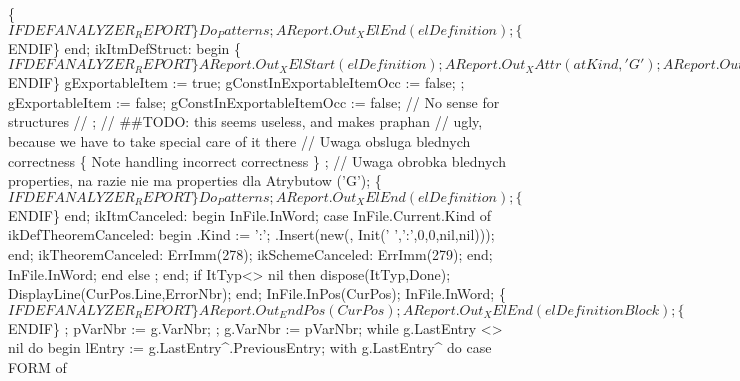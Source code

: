             \{$IFDEF ANALYZER_REPORT\}
            Do_Patterns;
            AReport.Out_XElEnd(elDefinition);
            \{$ENDIF\}
         end;
      ikItmDefStruct:
         begin
            \{$IFDEF ANALYZER_REPORT\}
            AReport.Out_XElStart(elDefinition);
            AReport.Out_XAttr(atKind, 'G');
            AReport.Out_XAttrEnd;
            \{$ENDIF\}
            gExportableItem := true;
            gConstInExportableItemOcc := false;
            ;
            gExportableItem := false;
            gConstInExportableItemOcc := false;
            // No sense for structures
            //     ;
            // ##TODO: this  seems useless, and makes praphan
            //         ugly, because we have to take special care of it there
            //   Uwaga obsluga blednych correctness
            \{ Note handling incorrect correctness \}
            ;
            //   Uwaga obrobka blednych properties, na razie nie ma properties dla Atrybutow
            ('G');
            \{$IFDEF ANALYZER_REPORT\}
            Do_Patterns;
            AReport.Out_XElEnd(elDefinition);
            \{$ENDIF\}
         end;
      ikItmCanceled:
         begin
            InFile.InWord;
            case InFile.Current.Kind of
               ikDefTheoremCanceled:
                  begin
                     .Kind := ':';
                     .Insert(new(, Init(' ',':',0,0,nil,nil)));
                  end;
               ikTheoremCanceled:
                  ErrImm(278);
               ikSchemeCanceled:
                  ErrImm(279);
            end;
            InFile.InWord;
         end
   else ;
   end;
   if ItTyp<> nil then dispose(ItTyp,Done);
   DisplayLine(CurPos.Line,ErrorNbr);
   end;
   InFile.InPos(CurPos); InFile.InWord;
   \{$IFDEF ANALYZER_REPORT\}
   AReport.Out_EndPos(CurPos);
   AReport.Out_XElEnd(elDefinitionBlock);
   \{$ENDIF\}
   ;
   pVarNbr := g.VarNbr;
   ;
   g.VarNbr := pVarNbr;
   while g.LastEntry <> nil do
   begin
      lEntry := g.LastEntry^.PreviousEntry;
      with g.LastEntry^ do
         case FORM of
